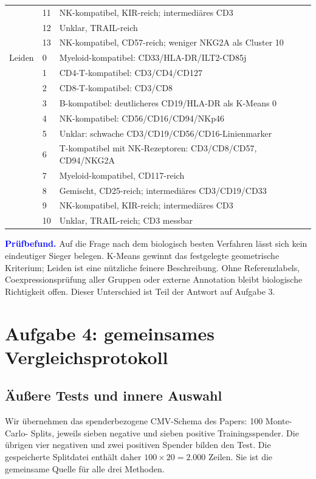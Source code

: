 \documentclass[11pt,a4paper]{article}
\newcommand{\finding}[1]{\par\smallskip\noindent\textcolor{blue}{\textbf{Prüfbefund.}} #1\par}
\begin{document}
\begin{table}[!ht]
\begin{tabular}{p{2.3cm}p{1cm}p{11.8cm}}
 & 11 & NK-kompatibel, KIR-reich; intermediäres CD3\\
 & 12 & Unklar, TRAIL-reich\\
 & 13 & NK-kompatibel, CD57-reich; weniger NKG2A als Cluster 10\\\midrule
Leiden & 0 & Myeloid-kompatibel: CD33/HLA-DR/ILT2-CD85j\\
 & 1 & CD4-T-kompatibel: CD3/CD4/CD127\\
 & 2 & CD8-T-kompatibel: CD3/CD8\\
 & 3 & B-kompatibel: deutlicheres CD19/HLA-DR als K-Means 0\\
 & 4 & NK-kompatibel: CD56/CD16/CD94/NKp46\\
 & 5 & Unklar: schwache CD3/CD19/CD56/CD16-Linienmarker\\
 & 6 & T-kompatibel mit NK-Rezeptoren: CD3/CD8/CD57, CD94/NKG2A\\
 & 7 & Myeloid-kompatibel, CD117-reich\\
 & 8 & Gemischt, CD25-reich; intermediäres CD3/CD19/CD33\\
 & 9 & NK-kompatibel, KIR-reich; intermediäres CD3\\
 & 10 & Unklar, TRAIL-reich; CD3 messbar\\
\bottomrule\end{tabular}
\end{table}
\finding{Auf die Frage nach dem biologisch besten Verfahren lässt sich kein
eindeutiger Sieger belegen. K-Means gewinnt das festgelegte geometrische
Kriterium; Leiden ist eine nützliche feinere Beschreibung. Ohne Referenzlabels,
Coexpressionsprüfung aller Gruppen oder externe Annotation bleibt biologische
Richtigkeit offen. Dieser Unterschied ist Teil der Antwort auf Aufgabe 3.}

\clearpage
\section{Aufgabe 4: gemeinsames Vergleichsprotokoll}\label{sec:protokoll}
\subsection*{Äußere Tests und innere Auswahl}
Wir übernehmen das spenderbezogene CMV-Schema des Papers: 100 Monte-Carlo-
Splits, jeweils sieben negative und sieben positive Trainingsspender.
Die übrigen vier negativen und zwei positiven Spender bilden den Test.
Die gespeicherte Splitdatei enthält daher \(100\times20=2.000\) Zeilen.
Sie ist die gemeinsame Quelle für alle drei Methoden.
\end{document}
